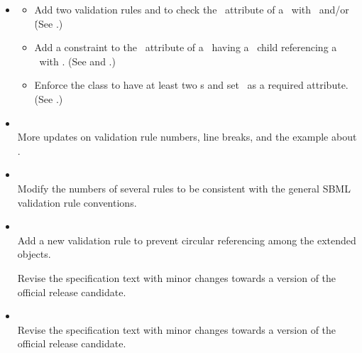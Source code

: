 \begin{itemize}
 \item {} 
 \label{def:v1_1_rc5}
  \begin{itemize}
  \item Add two validation rules  and  to check the \speciesTypeAtt\ attribute of a \species\ with \listOfOutwardBindingSites\ and/or \listOfSpeciesFeatures\. (See .)
  \item Add a constraint to the \relationAtt\ attribute of a \subListOfSpeciesFeatures\ having a \speciesFeature\ child referencing a \speciesFeatureType\ with . (See  and .)
  \item Enforce the \SubListOfSpeciesFeatures class to have at least two \speciesFeature s and set \relationAtt\ as a required attribute. (See .)
 \end{itemize}
 

 \item {} \\
 \label{def:v1_1_rc4}
 More updates on validation rule numbers, line breaks, and the example about \SubListOfSpeciesFeatures. 

 \item {} \\
 \label{def:v1_1_rc3}
 Modify the numbers of several rules to be consistent with the general SBML validation rule conventions. 

 \item {} \\
 \label{def:v1_1_rc2}
 Add a new validation rule  to prevent circular referencing among the extended \ExCompartment objects.
 
 Revise the specification text with minor changes towards a version of the official release candidate. 

 \item {} \\
 \label{def:v1_1_rc1}
 Revise the specification text with minor changes towards a version of the official release candidate. 

\end{itemize}

